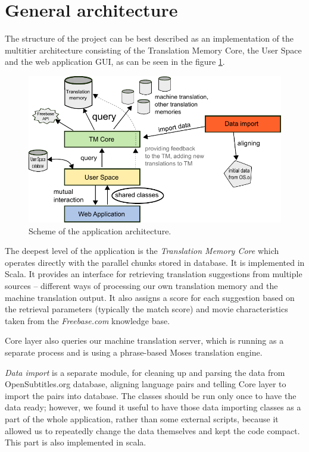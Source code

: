 \section{General architecture}
The structure of the project can be best described as an implementation of the multitier architecture consisting of the Translation Memory Core, the User Space and the web application GUI, as can be seen in the figure \ref{projectStructure:layers}.

\begin{figure}[h]
\begin{center}
\includegraphics{figures/scheme.pdf}
\end{center}
\caption{Scheme of the application architecture.}\label{projectStructure:layers}
\end{figure}

The deepest level of the application is the \emph{Translation Memory Core} which operates directly with the parallel chunks stored in database. It is implemented in Scala. It provides an interface for retrieving translation suggestions from multiple sources -- different ways of processing our own translation memory and the machine translation output. It also assigns a score for each suggestion based on the retrieval parameters (typically the match score) and movie characteristics taken from the \emph{Freebase.com} knowledge base.

Core layer also queries our machine translation server, which is running as a separate process and is using a phrase-based Moses translation engine.

\emph{Data import} is a separate module, for cleaning up and parsing the data from OpenSubtitles.org database, aligning language pairs and telling Core layer to import the pairs into database. The classes should be run only once to have the data ready; however, we found it useful to have those data importing classes as a part of the whole application, rather than some external scripts, because it allowed us to repeatedly change the data themselves and kept the code compact. This part is also implemented in scala.

